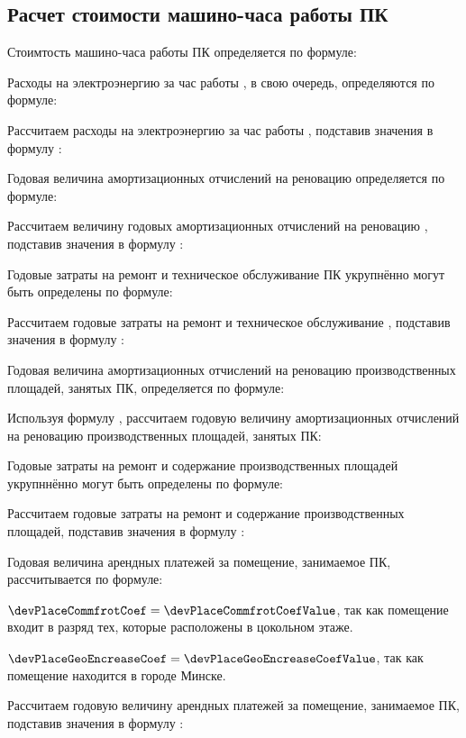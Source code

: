 \subsection{Расчет стоимости машино-часа работы ПК}
\label{sec:economics:cpuclocktime}

Стоимтость машино-часа работы ПК определяется по формуле:
\pcHourCostEquation

Расходы на электроэнергию за час работы \pc, в свою очередь, определяются по формуле:
\energyHourCostEquation

Рассчитаем расходы на электроэнергию за час работы \pc, подставив значения в формулу :
\energyHourCostFormulaApplied

Годовая величина амортизационных отчислений на реновацию \pc определяется по формуле:
\pcAmortizationCostEquation

Рассчитаем величину годовых амортизационных отчислений на реновацию \pc, подставив значения в формулу :
\pcAmortizationCostFormulaApplied

Годовые затраты на ремонт и техническое обслуживание ПК укрупнённо могут быть определены по формуле:
\pcSupportCostEquation

Рассчитаем годовые затраты на ремонт и техническое обслуживание \pc, подставив значения в формулу :
\pcSupportCostFormulaApplied

Годовая величина амортизационных отчислений на реновацию производственных площадей, занятых ПК, определяется по формуле:
\devPlaceAmortizationCostEquation

Используя формулу , рассчитаем годовую величину амортизационных отчислений на реновацию производственных площадей, занятых ПК:
\devPlaceAmortizationCostFormulaApplied

Годовые затраты на ремонт и содержание производственных площадей укрупннённо могут быть определены по формуле:
\devPlaceSupportCostEquation

Рассчитаем годовые затраты на ремонт и содержание производственных площадей, подставив значения в формулу :
\devPlaceSupportCostFormulaApplied

Годовая величина арендных платежей за помещение, занимаемое ПК, рассчитывается по формуле:
\devPlaceRentCostEquation

\(\devPlaceCommfrotCoef = \devPlaceCommfrotCoefValue\), так как помещение входит в разряд тех, которые расположены в цокольном этаже.

\(\devPlaceGeoEncreaseCoef = \devPlaceGeoEncreaseCoefValue\), так как помещение находится в городе Минске.

Рассчитаем годовую величину арендных платежей за помещение, занимаемое ПК, подставив значения в формулу :
\devPlaceRentCostFormulaApplied